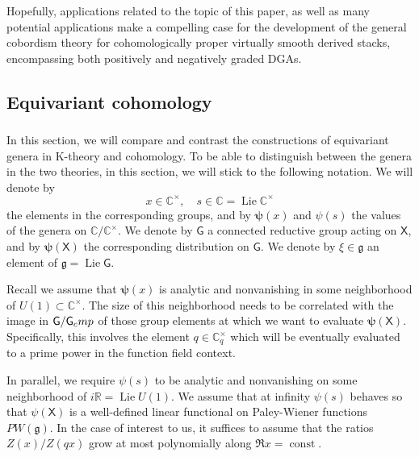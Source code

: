\documentclass[14pt]{extarticle}
\newcommand{\C}{\mathbb{C}}
\newcommand{\Ct}{\mathbb{C}^\times}
\newcommand{\R}{\mathbb{R}}
\newcommand{\bG}{\mathsf{G}}
\newcommand{\bX}{\mathsf{X}}
\newcommand{\bpsi}{\boldsymbol{\psi}}
\newcommand{\fg}{\mathfrak{g}}
\newcommand{\comp}{\textup{cmp}}
\DeclareMathOperator{\Lie}{Lie}
\DeclareMathOperator{\const}{const}
\theoremstyle{definition}
\begin{document}
\subsubsection{}

Hopefully, applications related to the topic of this paper, as well as many
potential applications make a compelling case for the development of
the general cobordism theory for cohomologically proper virtually
smooth derived stacks, encompassing both positively and negatively
graded DGAs. 

\subsection{Equivariant cohomology}\label{s_limitH} 

\subsubsection{}

In this section, we will compare and contrast the constructions of
equivariant genera in K-theory and cohomology. To be able to
distinguish between the genera in the two theories, in this section,
we will stick to the following notation. We will denote by
\[
  x \in \Ct, \quad s \in \C = \Lie \Ct
\]
the elements in the corresponding groups, and by $\bpsi(x)$ and
$\psi(s)$ the values of the genera on $\C/\Ct$. We denote by
$\bG$ a connected reductive group acting on $\bX$, and by $\bpsi(\bX)$
the corresponding distribution on $\bG$. We denote by $\xi\in \fg$ an
element of $\fg = \Lie \bG$. 

Recall we assume that $\bpsi(x)$
is analytic and nonvanishing in some neighborhood of $U(1) \subset
\Ct$. The size of this neighborhood needs to be correlated with the
image in $\bG/\bG_\comp$ of those group elements at which we
want to evaluate  $\bpsi(\bX)$. Specifically, this involves the
element $q\in
\Ct_q$ which will be eventually evaluated to a prime power in the
function field context. 

In parallel, we require $\psi(s)$ to be analytic and nonvanishing on some neighborhood of
$i \R = \Lie U(1)$. We assume that at infinity $\psi(s)$ behaves so
that $\psi(\bX)$ is a well-defined linear functional on Paley-Wiener functions
$PW(\fg)$. In the case of interest to us, it suffices to assume that
the ratios $Z(x)/Z(qx)$ grow at most polynomially along $\Re x =
\const$. 


\subsubsection{}
\end{document}
